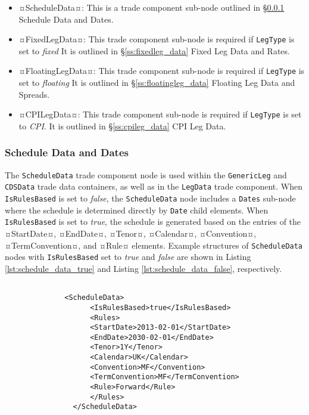 \begin{itemize}
\begin{lstlisting}[caption=Notionals, label=lst:notionals]
\end{lstlisting}



\item ¤ScheduleData¤: This is a trade component sub-node outlined in \S \ref{ss:schedule_data} Schedule Data and Dates.  
\item ¤FixedLegData¤: This trade component sub-node is required if \lstinline!LegType! is set to \emph{fixed} It is outlined in \S \ref{ss:fixedleg_data} Fixed Leg Data and Rates. 
\item ¤FloatingLegData¤: This trade component sub-node is required if \lstinline!LegType! is set to \emph{floating} It is outlined in \S \ref{ss:floatingleg_data} Floating Leg Data and Spreads.
\item ¤CPILegData¤: This trade component sub-node is required if \lstinline!LegType! is set to \emph{CPI}. It is outlined in \S \ref{ss:cpileg_data} CPI Leg Data.
\end{itemize}






\subsubsection{Schedule Data and Dates}
\label{ss:schedule_data}

The \lstinline!ScheduleData! trade component node is used within the \lstinline!GenericLeg! and \lstinline!CDSData! trade data containers, as well as in the \lstinline!LegData! trade component. When \lstinline!IsRulesBased! is set to \emph{false}, the \lstinline!ScheduleData! node includes a \lstinline!Dates! sub-node  where the schedule is determined directly by  \lstinline!Date! child elements. When \lstinline!IsRulesBased! is set to \emph{true}, the schedule is generated based on the entries of the ¤StartDate¤, ¤EndDate¤, ¤Tenor¤, ¤Calendar¤,  ¤Convention¤, ¤TermConvention¤, and  ¤Rule¤ elements.
Example structures of  \lstinline!ScheduleData! nodes with \lstinline!IsRulesBased! set to \emph{true} and \emph{false} are shown in Listing \ref{lst:schedule_data_true} and Listing \ref{lst:schedule_data_false}, respectively.

\begin{lstlisting}[caption=ScheduleData with IsRulesBased:  true, label=lst:schedule_data_true]

              <ScheduleData>
                    <IsRulesBased>true</IsRulesBased>
                    <Rules>
                    <StartDate>2013-02-01</StartDate>
                    <EndDate>2030-02-01</EndDate>
                    <Tenor>1Y</Tenor>
                    <Calendar>UK</Calendar>
                    <Convention>MF</Convention>
                    <TermConvention>MF</TermConvention>
                    <Rule>Forward</Rule>
                    </Rules>
                </ScheduleData>

\end{lstlisting}

